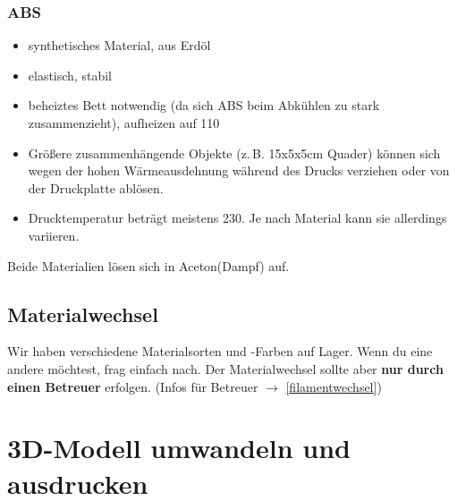 \documentclass{\basedir/fablab-document}
\begin{document}
\subsubsection{ABS}
\begin{itemize}
 \item synthetisches Material, aus Erdöl
 \item elastisch, stabil
 \item beheiztes Bett notwendig (da sich ABS beim Abkühlen zu stark zusammenzieht), aufheizen auf 110\textcelsius{}
 \item Größere zusammenhängende Objekte (z.\,B. 15x5x5cm Quader) können sich wegen der hohen Wärmeausdehnung während des Drucks verziehen oder von der Druckplatte ablösen.
 \item Drucktemperatur beträgt meistens 230\textcelsius{}. Je nach Material kann sie allerdings variieren.
\end{itemize}

Beide Materialien lösen sich in Aceton(Dampf) auf.

\subsection{Materialwechsel}
Wir haben verschiedene Materialsorten und -Farben auf Lager. Wenn du eine andere möchtest, frag einfach nach.
Der Materialwechsel sollte aber \textbf{nur durch einen Betreuer} erfolgen. (Infos für Betreuer $\to$ \ref{filamentwechsel})


\section{3D-Modell umwandeln und ausdrucken}
\end{document}
